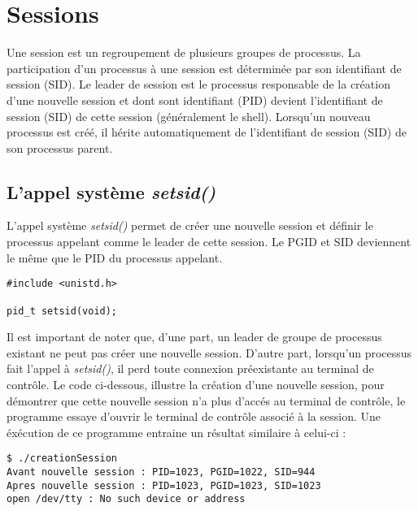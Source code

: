 \section{Sessions}
Une session est un regroupement de plusieurs groupes de processus. La participation d'un processus à une session est déterminée par son identifiant de session (SID). Le leader de session est le processus responsable de la création d'une nouvelle session et dont sont identifiant (PID) devient l'identifiant de session (SID) de cette session (généralement le shell). Lorsqu'un nouveau processus est créé, il hérite automatiquement de l'identifiant de session (SID) de son processus parent.

\subsection{L’appel système \textit{setsid()} }
L’appel système \textit{setsid()} permet de créer une nouvelle session et définir le processus appelant comme le leader de cette session. Le PGID et SID deviennent le même que le PID du processus appelant.
\newline
\begin{lstlisting}
#include <unistd.h>

pid_t setsid(void);
\end{lstlisting}
Il est important de noter que, d'une part, un leader de groupe de processus existant ne peut pas créer une nouvelle session. D'autre part, lorsqu'un processus fait l'appel à \textit{setsid()}, il perd toute connexion préexistante au terminal de contrôle. 
\newline
Le code ci-dessous, illustre la création d'une nouvelle session, pour démontrer que cette nouvelle session n'a plus d'accés au terminal de contrôle, le programme essaye d'ouvrir
le terminal de contrôle associé à la session. Une éxécution de ce programme entraine un résultat similaire à celui-ci  :

\begin{lstlisting}
$ ./creationSession
Avant nouvelle session : PID=1023, PGID=1022, SID=944
Apres nouvelle session : PID=1023, PGID=1023, SID=1023
open /dev/tty : No such device or address
\end{lstlisting}



